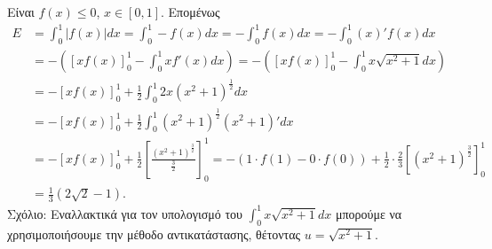 \begin{alist}
    \item [δ)] Είναι $f(x) \leq 0$, $x \in [0,1]$. Επομένως
    \begin{align*}
        E &= \int_{0}^{1} |f(x)| dx = \int_{0}^{1} -f(x) dx = -\int_{0}^{1} f(x) dx = -\int_{0}^{1} (x)' f(x) dx \\
        &= - \left([xf(x)]_0^1 - \int_{0}^{1} x f'(x) dx \right) = - \left([xf(x)]_0^1 - \int_{0}^{1} x \sqrt{x^2+1} dx \right) \\
        &= -[xf(x)]_0^1 + \frac{1}{2} \int_{0}^{1} 2x(x^2+1)^{\frac{1}{2}} dx \\
        &= -[xf(x)]_0^1 + \frac{1}{2} \int_{0}^{1} (x^2+1)^{\frac{1}{2}} (x^2+1)' dx \\
        &= -[xf(x)]_0^1 + \frac{1}{2} \left[ \frac{(x^2+1)^{\frac{3}{2}}}{\frac{3}{2}} \right]_0^1 = -(1 \cdot f(1) - 0 \cdot f(0)) + \frac{1}{2} \cdot \frac{2}{3} \left[(x^2+1)^{\frac{3}{2}}\right]_0^1 \\
        &= \frac{1}{3} (2\sqrt{2}-1).
    \end{align*}
    Σχόλιο: Εναλλακτικά για τον υπολογισμό του $\int_{0}^{1} x \sqrt{x^2+1} dx$ μπορούμε να χρησιμοποιήσουμε την μέθοδο αντικατάστασης, θέτοντας $u = \sqrt{x^2+1}$.
\end{alist}